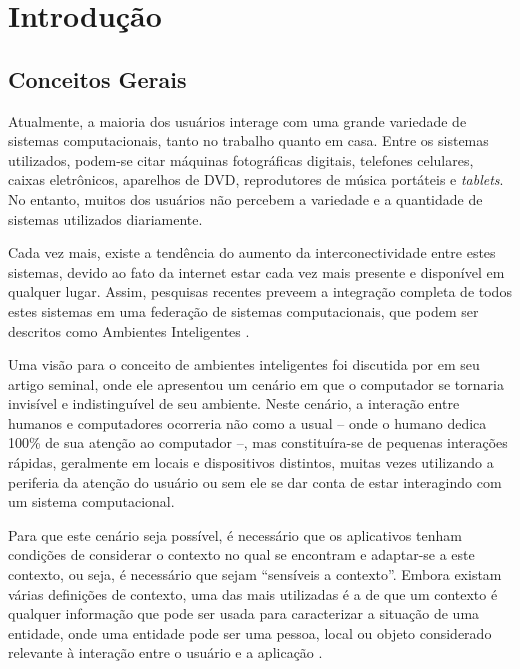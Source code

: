 \chapter{Introdução}
\label{ch:introducao}

\section{Conceitos Gerais}
\label{sec:conceitos}

Atualmente, a maioria dos usuários interage com uma grande variedade de sistemas computacionais, tanto no trabalho quanto em casa. Entre os sistemas utilizados, podem-se citar máquinas fotográficas digitais, telefones celulares, caixas eletrônicos, aparelhos de DVD, reprodutores de música portáteis e {\em tablets}. No entanto, muitos dos usuários não percebem a variedade e a quantidade de sistemas utilizados diariamente.

Cada vez mais, existe a tendência do aumento da interconectividade entre estes sistemas, devido ao fato da internet estar cada vez mais presente e disponível em qualquer lugar. Assim, pesquisas recentes preveem a integração completa de todos estes sistemas em uma federação de sistemas computacionais, que podem ser descritos como Ambientes Inteligentes \cite{heckmann05}.

Uma visão para o conceito de ambientes inteligentes foi discutida por  em seu artigo seminal, onde ele apresentou um cenário em que o computador se tornaria invisível e indistinguível de seu ambiente. Neste cenário, a interação entre humanos e computadores ocorreria não como a usual -- onde o humano dedica 100\% de sua atenção ao computador --, mas constituíra-se de pequenas interações rápidas, geralmente em locais e dispositivos distintos, muitas vezes utilizando a periferia da atenção do usuário \cite{weiser96} ou sem ele se dar conta de estar interagindo com um sistema computacional.

Para que este cenário seja possível, é necessário que os aplicativos tenham condições de considerar o contexto no qual se encontram e adaptar-se a este contexto, ou seja, é necessário que sejam ``sensíveis a contexto''. Embora existam várias definições de contexto, uma das mais utilizadas é a de que um contexto é qualquer informação que pode ser usada para caracterizar a situação de uma entidade, onde uma entidade pode ser uma pessoa, local ou objeto considerado relevante à interação entre o usuário e a aplicação \cite{dey2001}.

